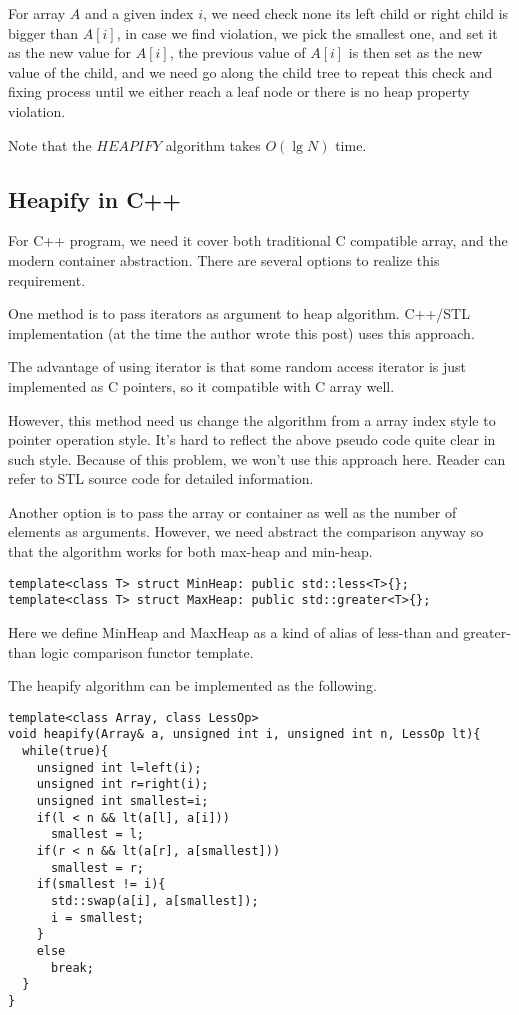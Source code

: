 \documentclass{article}
\begin{document}
For array $A$ and a given index $i$, we need check none its left child or right child
is bigger than $A[i]$, in case we find violation, we pick the smallest one, and set
it as the new value for $A[i]$, the previous value of $A[i]$ is then set as the
new value of the child, and we need go along the child tree to repeat this check and fixing
process until we either reach a leaf node or there is no heap property violation.

Note that the $HEAPIFY$ algorithm takes $O(\lg{N})$ time.

\subsection*{Heapify in C++}

For C++ program, we need it cover both traditional C compatible array, and
the modern container abstraction. There are several options to realize this
requirement.

One method is to pass iterators as argument to heap algorithm. C++/STL
implementation (at the time the author wrote this post) uses this approach.

The advantage of using iterator is that some random access iterator is
just implemented as C pointers, so it compatible with C array well.

However, this method need us change the algorithm from a array index style
to pointer operation style. It's hard to reflect the above pseudo code
quite clear in such style. Because of this problem, we won't use this approach
here. Reader can refer to STL source code for detailed information.

Another option is to pass the array or container as well as the 
number of elements as arguments. However, we need abstract the 
comparison anyway so that the algorithm works for both max-heap
and min-heap.

\lstset{language=C++}
\begin{lstlisting}
template<class T> struct MinHeap: public std::less<T>{};
template<class T> struct MaxHeap: public std::greater<T>{};
\end{lstlisting}

Here we define MinHeap and MaxHeap as a kind of alias of less-than
and greater-than logic comparison functor template.

The heapify algorithm can be implemented as the following.

\begin{lstlisting}
template<class Array, class LessOp>
void heapify(Array& a, unsigned int i, unsigned int n, LessOp lt){
  while(true){
    unsigned int l=left(i);
    unsigned int r=right(i);
    unsigned int smallest=i;
    if(l < n && lt(a[l], a[i]))
      smallest = l;
    if(r < n && lt(a[r], a[smallest]))
      smallest = r;
    if(smallest != i){
      std::swap(a[i], a[smallest]);
      i = smallest;
    }
    else
      break;
  }
}
\end{lstlisting}
\end{document}
